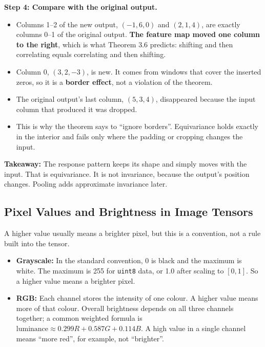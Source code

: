 \textbf{Step 4: Compare with the original output.}
\begin{itemize}
  \item Columns 1--2 of the new output, $(-1, 6, 0)$ and $(2, 1, 4)$, are exactly columns 0--1 of the original output. \textbf{The feature map moved one column to the right}, which is what Theorem 3.6 predicts: shifting and then correlating equals correlating and then shifting.
  \item Column 0, $(3, 2, -3)$, is new. It comes from windows that cover the inserted zeros, so it is a \textbf{border effect}, not a violation of the theorem.
  \item The original output's last column, $(5, 3, 4)$, disappeared because the input column that produced it was dropped.
  \item This is why the theorem says to ``ignore borders''. Equivariance holds exactly in the interior and fails only where the padding or cropping changes the input.
\end{itemize}

\textbf{Takeaway:} The response pattern keeps its shape and simply moves with the input. That is equivariance. It is not invariance, because the output's position changes. Pooling adds approximate invariance later.

\subsection*{Pixel Values and Brightness in Image Tensors}

A higher value usually means a brighter pixel, but this is a convention, not a rule built into the tensor.

\begin{itemize}
  \item \textbf{Grayscale:} In the standard convention, 0 is black and the maximum is white. The maximum is 255 for \texttt{uint8} data, or 1.0 after scaling to $[0, 1]$. So a higher value means a brighter pixel.
  \item \textbf{RGB:} Each channel stores the intensity of one colour. A higher value means more of that colour. Overall brightness depends on all three channels together; a common weighted formula is $\text{luminance} \approx 0.299R + 0.587G + 0.114B$. A high value in a single channel means ``more red'', for example, not ``brighter''.
\end{itemize}


